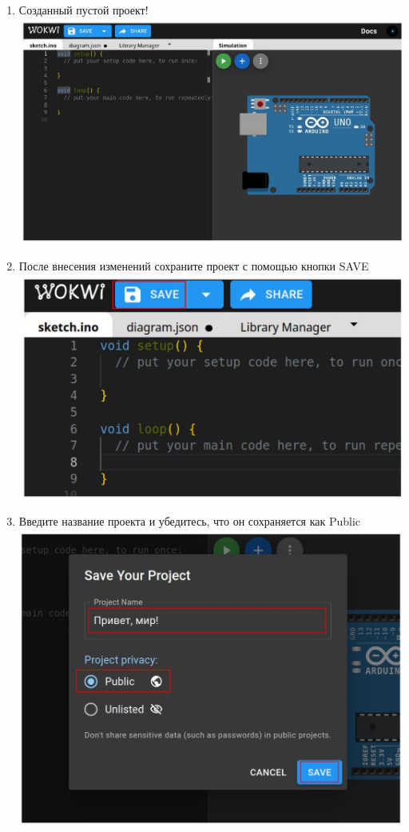 \begin{enumerate}
    \clearpage\item Созданный пустой проект!\\
    \includegraphics[max width=\maxwidth, max height=\maxheight, center]{7}

    \item После внесения изменений сохраните проект с помощью кнопки SAVE\\
    \includegraphics[max width=\maxwidth, max height=\maxheight, center]{8}

    \clearpage\item Введите название проекта и убедитесь, что он сохраняется как Public\\
    \includegraphics[max width=\maxwidth, max height=\maxheight, center]{9}


\end{enumerate}
